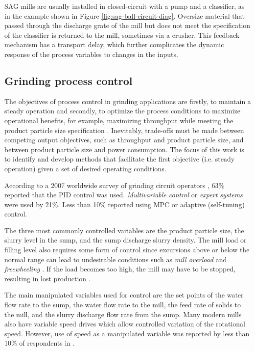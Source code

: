 \acrshort{SAG} mills are usually installed in closed-circuit with a pump and a classifier, as in the example shown in Figure \ref{fig:sag-ball-circuit-diag}. Oversize material that passed through the discharge grate of the mill but does not meet the specification of the classifier is returned to the mill, sometimes via a crusher. This feedback mechanism has a transport delay, which further complicates the dynamic response of the process variables to changes in the inputs.

\subsection{Grinding process control}

The objectives of process control in grinding applications are firstly, to maintain a steady operation and secondly, to optimize the process conditions to maximize operational benefits, for example, maximizing throughput while meeting the product particle size specification \citep{wei_grinding_2009}. Inevitably, trade-offs must be made between competing output objectives, such as throughput and product particle size, and between product particle size and power consumption. The focus of this work is to identify and develop methods that facilitate the first objective (i.e. steady operation) given a set of desired operating conditions.

According to a 2007 worldwide survey of grinding circuit operators \citep{wei_grinding_2009}, 63\% reported that the \gls{PID} control was used. \textit{Multivariable control} or \textit{expert systems} were used by 21\%. Less than 10\% reported using \gls{MPC} or adaptive (self-tuning) control.

The three most commonly controlled variables are the product particle size, the slurry level in the sump, and the sump discharge slurry density. The mill load or filling level also requires some form of control since excursions above or below the normal range can lead to undesirable conditions such as \textit{mill overload} and \textit{freewheeling} \citep{mcclure_overload_2015}. If the load becomes too high, the mill may have to be stopped, resulting in lost production \citep{wei_grinding_2009}.

The main manipulated variables used for control are the set points of the water flow rate to the sump, the water flow rate to the mill, the feed rate of solids to the mill, and the slurry discharge flow rate from the sump. Many modern mills also have variable speed drives which allow controlled variation of the rotational speed. However, use of speed as a manipulated variable was reported by less than 10\% of respondents in \cite{wei_grinding_2009}.

